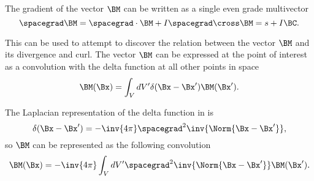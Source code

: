 %
%
The gradient of the vector \( \BM \) can be written as a single even grade multivector
%
\begin{equation}\label{eqn:helmholtzDerviationMultivector:60}
\spacegrad \BM
= \spacegrad \cdot \BM + I \spacegrad \cross \BM
= s + I \BC.
\end{equation}
%
%
%
%

This can be used to attempt to discover the relation between the vector \( \BM \) and its divergence and curl.  
The vector \( \BM \) can be expressed at the point of interest as a convolution with the delta function at all other points in space
\begin{equation}\label{eqn:helmholtzDerviationMultivector:80}
\BM(\Bx) = \int_V dV' \delta(\Bx - \Bx') \BM(\Bx').
\end{equation}

The Laplacian representation of the delta function in  is
\begin{equation}\label{eqn:helmholtzDerviationMultivector:100}
\delta(\Bx - \Bx') = -\inv{4\pi} \spacegrad^2 \inv{\Norm{\Bx - \Bx'}},
\end{equation}
so \( \BM \) can be represented as the following convolution
\begin{equation}\label{eqn:helmholtzDerviationMultivector:120}
\BM(\Bx) = -\inv{4\pi} \int_V dV' \spacegrad^2 \inv{\Norm{\Bx - \Bx'}} \BM(\Bx').
\end{equation}

%
%

